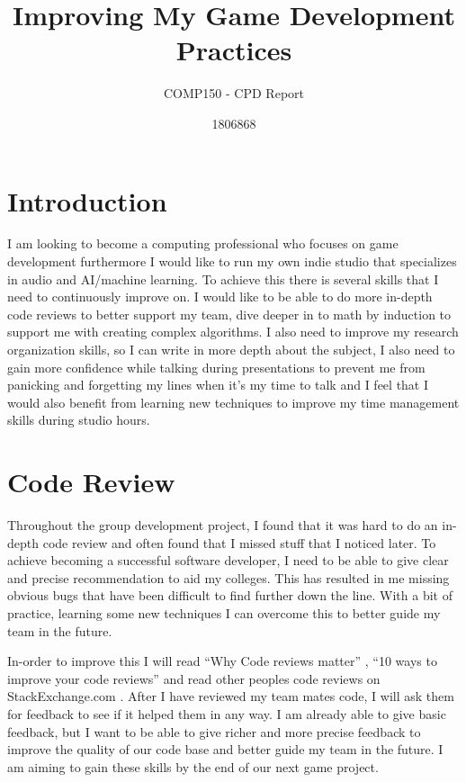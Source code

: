\documentclass{scrartcl}
\title{Improving My Game Development Practices}
\subtitle{COMP150 - CPD Report}
\author{1806868}
\begin{document}
\maketitle

\section{Introduction}

I am looking to become a computing professional who focuses on game development furthermore I would like to run my own indie studio that specializes in audio and AI/machine learning. To achieve this there is several skills that I need to continuously improve on. I would like to be able to do more in-depth code reviews to better support my team, dive deeper in to math by induction to support me with creating complex algorithms. I also need to improve my research organization skills, so I can write in more depth about the subject, I also need to gain more confidence while talking during presentations to prevent me from panicking and forgetting my lines when it’s my time to talk and I feel that I would also benefit from learning new techniques to improve my time management skills during studio hours.

\section{Code Review}

Throughout the group development project, I found that it was hard to do an in-depth code review and often found that I missed stuff that I noticed later. To achieve becoming a successful software developer, I need to be able to give clear and precise recommendation to aid my colleges. This has resulted in me missing obvious bugs that have been difficult to find further down the line. With a bit of practice, learning some new techniques I can overcome this to better guide my team in the future. 

In-order to improve this I will read “Why Code reviews matter” \cite{codeReviewsMatter}, “10 ways to improve your code reviews” \cite{waysToImprove} and read other peoples code reviews on StackExchange.com \cite{stackexchange}. After I have reviewed my team mates code, I will ask them for feedback to see if it helped them in any way. I am already able to give basic feedback, but I want to be able to give richer and more precise feedback to improve the quality of our code base and better guide my team in the future. I am aiming to gain these skills by the end of our next game project.
\end{document}
